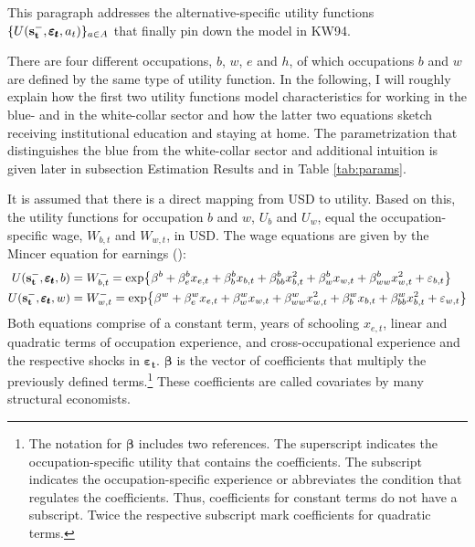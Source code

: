 \noindent
This paragraph addresses the alternative-specific utility functions $\{U(\bold{s_t^-}, \pmb{\varepsilon_t},a_t)\}_{a \in A}$ that finally pin down the model in KW94.

There are four different occupations, $b$, $w$, $e$ and $h$, of which occupations $b$ and $w$ are defined by the same type of utility function. In the following, I will roughly explain how the first two utility functions model characteristics for working in the blue- and in the white-collar sector and how the latter two equations sketch receiving institutional education and staying at home. The parametrization that distinguishes the blue from the white-collar sector and additional intuition is given later in subsection Estimation Results and in Table \ref{tab:params}.

It is assumed that there is a direct mapping from USD to utility. Based on this, the utility functions for occupation $b$ and $w$, $U_b$ and $U_w$, equal the occupation-specific wage, $W_{b,t}$ and $W_{w,t}$, in USD. The wage equations are given by the Mincer equation for earnings (\cite{Mincer.1958}):
\begin{equation} \label{eq:returns_b_w}
\begin{aligned}
U(\bold{s_t^-}, \pmb{\varepsilon_t},b) &= W_{b,t}^{-} = \text{exp}\big\{\beta^b + \beta_e^b x_{e,t} + \beta_b^b x_{b,t} + \beta_{bb}^b x^2_{b,t} + \beta_w^b x_{w,t} + \beta_{ww}^{b} x^2_{w,t} + \varepsilon_{b,t}\big\} \\
U(\bold{s_t^-},\pmb{\varepsilon_t},w) &= W_{w,t}^{-} = \text{exp}\big\{\beta^w + \beta_e^w x_{e,t} + \beta_w^w x_{w,t} + \beta_{ww}^w x^2_{w,t} + \beta_b^w x_{b,t} + \beta_{bb}^{w} x^2_{b,t} + \varepsilon_{w,t}\big\}
\end{aligned}
\end{equation}
\newline
Both equations comprise of a constant term, years of schooling $x_{e,t}$, linear and quadratic terms of occupation experience, and cross-occupational experience and the  respective shocks in $\pmb{\varepsilon_{t}}$. $\pmb{\beta}$ is the vector of coefficients that multiply the previously defined terms.\footnote{The notation for $\pmb{\beta}$ includes two references. The superscript indicates the occupation-specific utility that contains the coefficients. The subscript indicates the occupation-specific experience or abbreviates the condition that regulates the coefficients. Thus, coefficients for constant terms do not have a subscript. Twice the respective subscript mark coefficients for quadratic terms.} These coefficients are called covariates by many structural economists.


